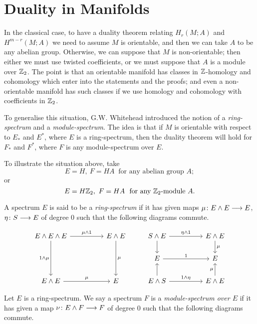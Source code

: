 \documentclass[../main]{subfiles}
\begin{document}
\chapter{Duality in Manifolds}
\label{sec:p3c10}
In the classical case, to have a duality theorem relating $H_r(M;A)$ and $H^{m-r}(M;A)$ we need to assume $M$ is orientable, and then we can take $A$ to be any abelian group. Otherwise, we can suppose that $M$ is non-orientable; then either we must use twisted coefficients, or we must suppose that $A$ is a module over $\mathbb{Z}_2$. The point is that an orientable manifold has classes in $\mathbb{Z}$-homology and cohomology which enter into the statements and the proofs; and even a non-orientable manifold has such classes if we use homology and cohomology with coefficients in $\mathbb{Z}_2$. 

To generalise this situation, G.W. Whitehead introduced the notion of a \emph{ring-spectrum} and a \emph{module-spectrum}. The idea is that if $M$ is orientable with respect to $E_*$ and $E^*$, where $E$ is a ring-spectrum, then the duality theorem will hold for $F_*$ and $F^*$, where $F$ is any module-spectrum over $E$.
\begin{examples}
To illustrate the situation above, take
\[E=H, \ F=HA \ \text{ for any abelian group } A;\]
or
\[E = H\mathbb{Z}_2, \ F=HA \ \text{ for any $\mathbb{Z}_2$-module } A.\]
\end{examples}

A spectrum $E$ is said to be a \emph{ring-spectrum}  if it has given maps $\mu \colon E \wedge E \longrightarrow E$, $\eta \colon S \longrightarrow E$ of degree 0 such that the following diagrams commute.


\[
\begin{tikzcd}
E \wedge E \wedge E \arrow[dd, "1 \wedge \mu"'] \arrow[rr, "\mu \wedge 1"] &  & E \wedge E \arrow[dd, "\mu"] & S \wedge E \arrow[rr, "\eta \wedge 1"] \arrow[d] &  & E \wedge E \arrow[d, "\mu"] \\
                                                                           &  &                              & E \arrow[rr, "1"]                                &  & E                           \\
E \wedge E \arrow[rr, "\mu"]                                               &  & E                            & E \wedge S \arrow[rr, "1 \wedge \eta"] \arrow[u] &  & E \wedge E \arrow[u, "\mu"]
\end{tikzcd}
\]

Let $E$ is a ring-spectrum. We say a spectrum $F$ is a \emph{module-spectrum over $E$}  if it has given a map $\nu \colon E \wedge F \longrightarrow F$ of degree 0 such that the following diagrams commute.
\end{document}
